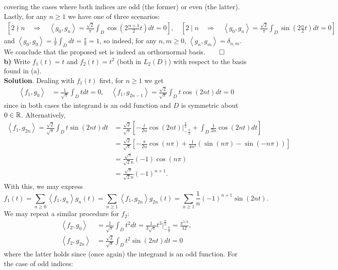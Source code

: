 \documentclass[10pt]{article}
\newcommand{\1}[1]{\mathbbm{1}_{#1}} \newcommand{\mc}[1]{\mathcal{#1}}
\newcommand{\ip}[2]{\left\langle#1,#2\right\rangle }
\begin{document}
    covering the cases where both indices are odd (the former) or even (the latter). Lastly, for any $n\geq 1$ we have one of three scenarios:
    \begin{align*}
        \left[2\nmid n\quad\Rightarrow\quad\ip{g_0}{g_n}=\frac{\sqrt{2}}{\pi}\int_{D}\cos(2\frac{n+1}{2}t)dt=0\right],\quad \left[2\mid n\quad\Rightarrow\quad\ip{g_0}{g_n}=\frac{\sqrt{2}}{\pi}\int_D\sin(2\frac{n}{2}t)dt=0\right]
    \end{align*}
    and $\ip{g_0}{g_0}=\frac{1}{\pi}\int_Ddt=\frac{\pi}{\pi}=1$, so indeed, for any $n,m\geq 0$, $\ip{g_n}{g_m}=\delta_{n,m}$. We conclude that the proposed set is indeed an orthornormal basis.\hfill{$\qed$}\\[5pt]
    {\bf b)} Write $f_1(t)=t$ and $f_2(t)=t^2$ (both in $L_2(D)$) with respect to the basis found in (a).\\[5pt]
    {\bf Solution}. Dealing with $f_1(t)$ first, for $n\geq 1$ we get
    \begin{align*}
        \ip{f_1}{g_0}&=\frac{1}{\sqrt{\pi}}\int_Dtdt=0,\quad\ip{f_1}{g_{2n-1}}=\frac{\sqrt{2}}{\sqrt{\pi}}\int_Dt\cos(2nt)dt=0
    \end{align*}
    since in both cases the integrand is an odd function and $D$ is symmetric about $0\in\mathbb{R}$. Alternatively,
    \begin{align*}
        \ip{f_1}{g_{2n}}=\frac{\sqrt{2}}{\sqrt{\pi}}\int_Dt\sin(2nt)dt&=\frac{\sqrt{2}}{\sqrt{\pi}}\left[-\frac{t}{2n}\cos(2nt)\bigg|^{\frac{\pi}{2}}_{-\frac{\pi}{2}}+\int_D\frac{1}{2n}\cos(2nt)dt\right]\\
        &=\frac{\sqrt{2}}{\sqrt{\pi}}\left[-\frac{\pi}{2n}\cos(n\pi)+\frac{1}{4n^2}\left(\sin(n\pi)-\sin(-n\pi)\right)\right]\\
        &=\frac{\sqrt{\pi}}{\sqrt{2}n}(-1)\cos(n\pi)\\
        &=\frac{\sqrt{\pi}}{\sqrt{2}n}(-1)^{n+1}.
    \end{align*}
    With this, we may express
    \[f_1(t)=\sum_{n\geq 0}\ip{f_1}{g_n}g_n(t)=\sum_{n\geq 1}\ip{f_1}{g_{2n}}g_{2n}(t)=\sum_{n\geq 1}\frac{1}{n}(-1)^{n+1}\sin(2nt).\]
    We may repeat a similar procedure for $f_2$:
    \begin{align*}
        \ip{f_2}{g_0}&=\frac{1}{\sqrt{\pi}}\int_Dt^2dt=\frac{1}{3\sqrt{\pi}}t^3\bigg|^{\frac{\pi}{2}}_{-\frac{\pi}{2}}=\frac{\pi^{5/2}}{12},\\
        \ip{f_2}{g_{2n}}&=\frac{\sqrt{2}}{\sqrt{\pi}}\int_Dt^2\sin(2nt)dt=0
    \end{align*}
    where the latter holds since (once again) the integrand is an odd function. For the case of odd indices:
\end{document}
